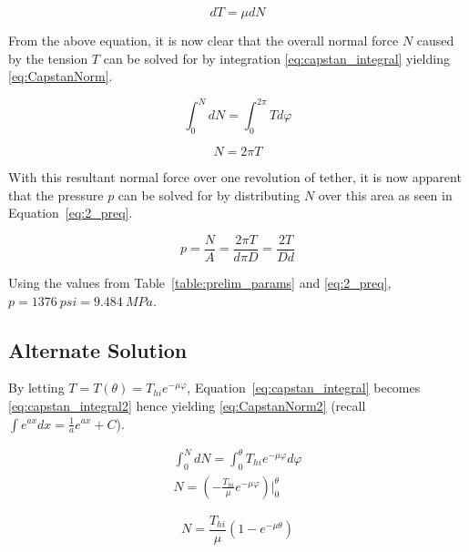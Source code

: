 \begin{equation}
	\label{eq:diffTens}
	dT = \mu dN
\end{equation}

From the above equation, it is now clear that the overall normal force $N$ caused by the tension $T$ can be solved for by integration \ref{eq:capstan_integral} yielding \ref{eq:CapstanNorm}.

\begin{equation}
	\label{eq:capstan_integral}
	\int_0^N dN =\int_0^{2\pi} T d\varphi
\end{equation}

\begin{equation}
	\label{eq:CapstanNorm}
	N=2\pi T	
\end{equation}

With this resultant normal force over one revolution of tether, it is now apparent that the pressure $p$ can be solved for by distributing $N$ over this area as seen in Equation~\ref{eq:2_preq}.

\begin{equation}
	\label{eq:2_preq}
	p=\frac{N}{A}=\frac{2\pi T}{d\pi D}=\frac{2T}{Dd}
\end{equation}

Using the values from Table~\ref{table:prelim_params} and \ref{eq:2_preq}, $p=1376\  psi= 9.484\  MPa$. 

\subsection{Alternate Solution}
\label{subsection:alt}
By letting $T = T(\theta)= T_{hi} e^{-\mu \varphi}$, Equation~\ref{eq:capstan_integral} becomes \ref{eq:capstan_integral2} hence yielding \ref{eq:CapstanNorm2} (recall $\int e^{ax} dx = \frac{1}{a} e^{ax} + C$).

\begin{equation}
	\label{eq:capstan_integral2}
	\begin{aligned}
	\int_0^N dN =\int_0^{\theta} T_{hi} e^{-\mu \varphi} d\varphi \\
	N = \left( -\frac{T_{hi}}{\mu} e^{-\mu \varphi} \right) \Big|_0^{\theta}
	\end{aligned}
\end{equation}

\begin{equation}
	\label{eq:CapstanNorm2}
	N = \frac{T_{hi}}{\mu} \left( 1 - e^{-\mu \theta} \right)
\end{equation}

